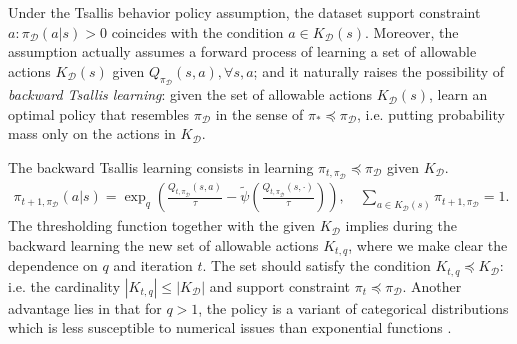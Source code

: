 \documentclass{article}
\newcommand{\AdaBracket}[1]{\left(#1\right)}
\newcommand{\datasetPolicy}{\pi_{\mathcal{D}}}
\begin{document}
Under the Tsallis behavior policy assumption, the dataset support constraint $a: \datasetPolicy(a|s) > 0$ coincides with the condition $a \in K_{\mathcal{D}}(s)$.
Moreover, the assumption actually assumes a forward process of learning a set of allowable actions $K_\mathcal{D}(s)$ given $Q_{\datasetPolicy}(s,a), \forall s,a$;
 and it naturally raises the possibility of \emph{backward Tsallis learning}: given the set of allowable actions $K_\mathcal{D}(s)$, learn an optimal policy that resembles $\datasetPolicy$ in the sense of $\pi_* \preceq \datasetPolicy$, i.e. putting probability mass only on the actions in $K_\mathcal{D}$.

 The backward Tsallis learning consists in learning $\pi_{t, \datasetPolicy} \preceq \datasetPolicy$ given $K_\mathcal{D}$.
\begin{align}
    \pi_{t+1, \datasetPolicy}(a|s) = \exp_q\AdaBracket{\frac{Q_{t, \datasetPolicy}(s,a)}{\tau} - \tilde{\psi}{\AdaBracket{\frac{Q_{t, \datasetPolicy}(s,\cdot)}{\tau}}}},  \quad \sum_{a\in K_{\mathcal{D}}(s)} \pi_{t+1, \datasetPolicy} = 1.
    \label{eq:proposal_policy}
\end{align}
The thresholding function together with the given $K_\mathcal{D}$ implies during the backward learning the new set of allowable actions $K_{t, q}$, where we make clear the dependence on $q$ and iteration $t$.
The set should satisfy the condition $K_{t, q} \preceq K_\mathcal{D}$:
 i.e. the cardinality $|K_{t, q}| \leq |K_\mathcal{D}|$ and support constraint $\pi_t \preceq \datasetPolicy$.
Another advantage lies in that for $q>1$, the policy is a variant of categorical distributions which is less susceptible to numerical issues than exponential functions \cite{Tsai2021-selfsupervisedRelativePredictiveCoding}.
\end{document}
